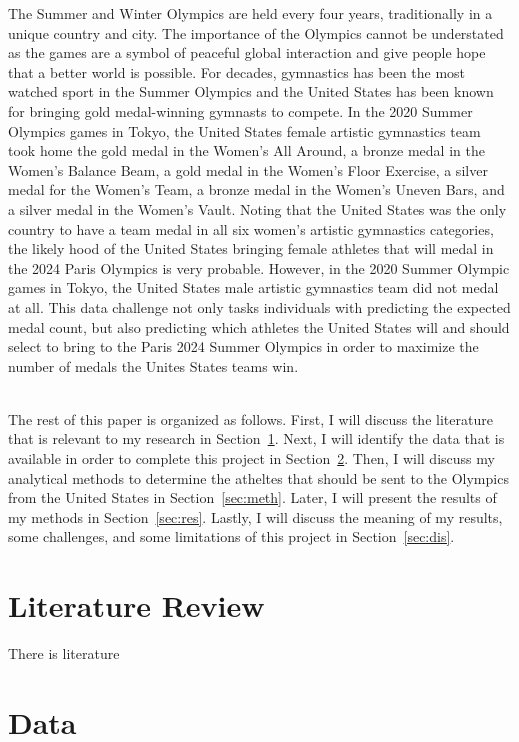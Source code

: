 \documentclass[12pt]{article}
\begin{document}
The Summer and Winter Olympics are held every four years, traditionally in a unique country and city.
The importance of the Olympics cannot be understated as the games are a symbol of peaceful global 
interaction and give people hope that a better world is possible. For decades, gymnastics  
has been the most watched sport in the Summer Olympics and the United States has been known for bringing gold 
medal-winning gymnasts to compete. In the 2020 Summer Olympics games in Tokyo, the United States 
female artistic gymnastics team took home the gold medal in the Women's All Around, a bronze medal 
in the Women's Balance Beam, a gold medal in the Women's Floor Exercise, a silver medal for the Women's
Team, a bronze medal in the Women's Uneven Bars, and a silver medal in the Women's Vault. 
Noting that the United States was the only country to have a team medal in all six women's artistic gymnastics 
categories, the likely hood of the United States bringing female athletes that will medal in the 2024 
Paris Olympics is very probable. However, in the 2020 Summer Olympic games in Tokyo, the United States 
male artistic gymnastics team did not medal at all. This data challenge not only tasks individuals 
with predicting the expected medal count, but also predicting which athletes the United States will 
and should select to bring to the Paris 2024 Summer Olympics in order to maximize the number of medals 
the Unites States teams win. 

\\

The rest of this paper is organized as follows. First, I will discuss the literature that is relevant to 
my research in Section~\ref{sec:lit}. Next, I will identify the data that is available in order to complete 
this project in Section~\ref{sec:data}. Then, I will discuss my 
analytical methods to determine the atheltes that should be sent to the Olympics from the United States 
in Section~\ref{sec:meth}. Later, I will present the results of my 
methods in Section~\ref{sec:res}. Lastly, I will discuss the meaning of my results, some challenges, 
and some limitations of this project in Section~\ref{sec:dis}.

\section{Literature Review}
\label{sec:lit}

There is literature

\section{Data}
\label{sec:data}
\end{document}
